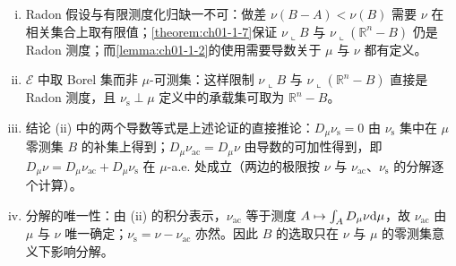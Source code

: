 \documentclass[../../main.tex]{subfiles}%
\begin{document}
\begin{remark}\label{remark:ch01-thm-1-31-条件}
\begin{enumerate}[(i)]
\item Radon 假设与有限测度化归缺一不可：做差 $\nu(B-A)<\nu(B)$ 需要 $\nu$ 在相关集合上取有限值；\cref{theorem:ch01-1-7}保证 $\nu\llcorner B$ 与 $\nu\llcorner(\mathbb{R}^n-B)$ 仍是 Radon 测度；而\cref{lemma:ch01-1-2}的使用需要导数关于 $\mu$ 与 $\nu$ 都有定义。%
\item $\mathcal{E}$ 中取 Borel 集而非 $\mu$-可测集：这样限制 $\nu\llcorner B$ 与 $\nu\llcorner(\mathbb{R}^n-B)$ 直接是 Radon 测度，且 $\nu_{\mathrm{s}}\perp\mu$ 定义中的承载集可取为 $\mathbb{R}^n-B$。
\item 结论 (ii) 中的两个导数等式是上述论证的直接推论：$D_{\mu}\nu_{\mathrm{s}}=0$ 由 $\nu_{\mathrm{s}}$ 集中在 $\mu$ 零测集 $B$ 的补集上得到；$D_{\mu}\nu_{\mathrm{ac}}=D_{\mu}\nu$ 由导数的可加性得到，即 $D_{\mu}\nu=D_{\mu}\nu_{\mathrm{ac}}+D_{\mu}\nu_{\mathrm{s}}$ 在 $\mu$-a.e. 处成立（两边的极限按 $\nu$ 与 $\nu_{\mathrm{ac}}$、$\nu_{\mathrm{s}}$ 的分解逐个计算）。
\item 分解的唯一性：由 (ii) 的积分表示，$\nu_{\mathrm{ac}}$ 等于测度 $A\mapsto\int_A D_{\mu}\nu\mathrm{d}\mu$，故 $\nu_{\mathrm{ac}}$ 由 $\mu$ 与 $\nu$ 唯一确定；$\nu_{\mathrm{s}}=\nu-\nu_{\mathrm{ac}}$ 亦然。因此 $B$ 的选取只在 $\nu$ 与 $\mu$ 的零测集意义下影响分解。
\end{enumerate}
\end{remark}
\end{document}

